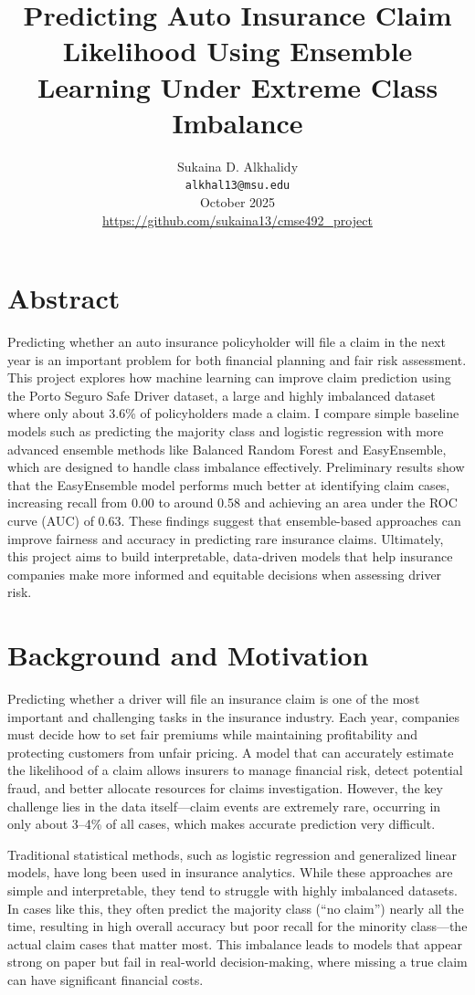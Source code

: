 \documentclass[11pt]{article}
\title{\textbf{Predicting Auto Insurance Claim Likelihood Using Ensemble Learning Under Extreme Class Imbalance}}
\author{
Sukaina D. Alkhalidy \\
\texttt{alkhal13@msu.edu} \\
October 2025 \\
\href{https://github.com/sukaina13/cmse492_project}{https://github.com/sukaina13/cmse492\_project}
}
\date{}
\begin{document}
\maketitle

\section*{Abstract}
Predicting whether an auto insurance policyholder will file a claim in the next year is an important problem for both financial planning and fair risk assessment. This project explores how machine learning can improve claim prediction using the Porto Seguro Safe Driver dataset, a large and highly imbalanced dataset where only about 3.6\% of policyholders made a claim. I compare simple baseline models such as predicting the majority class and logistic regression with more advanced ensemble methods like Balanced Random Forest and EasyEnsemble, which are designed to handle class imbalance effectively. Preliminary results show that the EasyEnsemble model performs much better at identifying claim cases, increasing recall from 0.00 to around 0.58 and achieving an area under the ROC curve (AUC) of 0.63. These findings suggest that ensemble-based approaches can improve fairness and accuracy in predicting rare insurance claims. Ultimately, this project aims to build interpretable, data-driven models that help insurance companies make more informed and equitable decisions when assessing driver risk.

\section{Background and Motivation}
Predicting whether a driver will file an insurance claim is one of the most important and challenging tasks in the insurance industry. Each year, companies must decide how to set fair premiums while maintaining profitability and protecting customers from unfair pricing. A model that can accurately estimate the likelihood of a claim allows insurers to manage financial risk, detect potential fraud, and better allocate resources for claims investigation. However, the key challenge lies in the data itself—claim events are extremely rare, occurring in only about 3–4\% of all cases, which makes accurate prediction very difficult.

Traditional statistical methods, such as logistic regression and generalized linear models, have long been used in insurance analytics. While these approaches are simple and interpretable, they tend to struggle with highly imbalanced datasets. In cases like this, they often predict the majority class (“no claim”) nearly all the time, resulting in high overall accuracy but poor recall for the minority class—the actual claim cases that matter most. This imbalance leads to models that appear strong on paper but fail in real-world decision-making, where missing a true claim can have significant financial costs.
\end{document}
